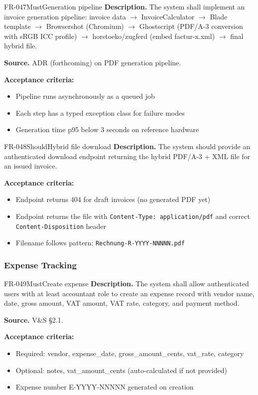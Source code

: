 \documentclass[11pt,a4paper]{article}
\begin{document}
\begin{requirement}{FR-047}{Must}{Generation pipeline}
\textbf{Description.} The system shall implement an invoice generation pipeline: invoice data $\rightarrow$ InvoiceCalculator $\rightarrow$ Blade template $\rightarrow$ Browsershot (Chromium) $\rightarrow$ Ghostscript (PDF/A-3 conversion with sRGB ICC profile) $\rightarrow$ horstoeko/zugferd (embed factur-x.xml) $\rightarrow$ final hybrid file.

\textbf{Source.} ADR (forthcoming) on PDF generation pipeline.

\textbf{Acceptance criteria:}
\begin{itemize}
    \item Pipeline runs asynchronously as a queued job
    \item Each step has a typed exception class for failure modes
    \item Generation time p95 below 3 seconds on reference hardware
\end{itemize}
\end{requirement}

\begin{requirement}{FR-048}{Should}{Hybrid file download}
\textbf{Description.} The system should provide an authenticated download endpoint returning the hybrid PDF/A-3 + XML file for an issued invoice.

\textbf{Acceptance criteria:}
\begin{itemize}
    \item Endpoint returns 404 for draft invoices (no generated PDF yet)
    \item Endpoint returns the file with \texttt{Content-Type: application/pdf} and correct \texttt{Content-Disposition} header
    \item Filename follows pattern: \texttt{Rechnung-R-YYYY-NNNNN.pdf}
\end{itemize}
\end{requirement}

\subsubsection{Expense Tracking}

\begin{requirement}{FR-049}{Must}{Create expense}
\textbf{Description.} The system shall allow authenticated users with at least accountant role to create an expense record with vendor name, date, gross amount, VAT amount, VAT rate, category, and payment method.

\textbf{Source.} V\&S \S2.1.

\textbf{Acceptance criteria:}
\begin{itemize}
    \item Required: vendor, expense\_date, gross\_amount\_cents, vat\_rate, category
    \item Optional: notes, vat\_amount\_cents (auto-calculated if not provided)
    \item Expense number E-YYYY-NNNNN generated on creation
\end{itemize}
\end{requirement}
\end{document}

